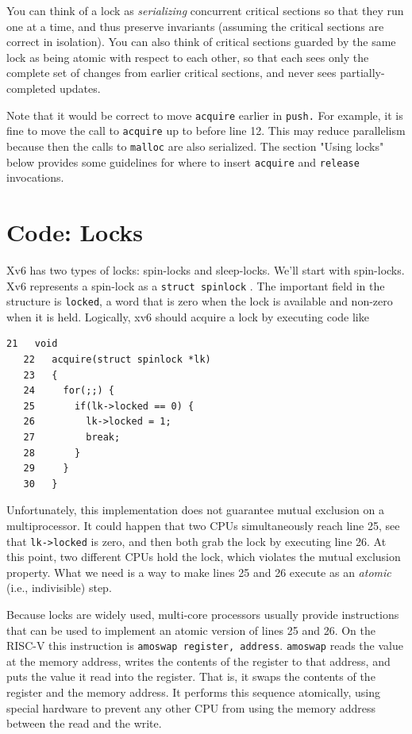 You can think of a lock as
\textit{serializing}
concurrent critical sections so that they run one at a time,
and thus preserve invariants (assuming the critical sections
are correct in isolation).
You can also think of critical sections guarded by the same lock as being
atomic with respect to each other,
so that each sees only the complete set of
changes from earlier critical sections, and never sees
partially-completed updates.

Note that it would be correct to move
\lstinline{acquire}
earlier in
\lstinline{push.}
For example, it is fine to move the call to
\lstinline{acquire}
up to before line 12.
This may reduce parallelism because then the calls
to
\lstinline{malloc}
are also serialized.
The section "Using locks" below provides some guidelines for where to insert
\lstinline{acquire}
and
\lstinline{release}
invocations.
\section{Code: Locks}
Xv6 has two types of locks: spin-locks and sleep-locks.
We'll start with spin-locks.
Xv6 represents a spin-lock as a
\lstinline{struct spinlock}
.
The important field in the structure is
\lstinline{locked},
a word that is zero when the lock is available
and non-zero when it is held.
Logically, xv6 should acquire a lock by executing code like
\begin{lstlisting}[]
   21	void
   22	acquire(struct spinlock *lk)
   23	{
   24	  for(;;) {
   25	    if(lk->locked == 0) {
   26	      lk->locked = 1;
   27	      break;
   28	    }
   29	  }
   30	}
\end{lstlisting}
Unfortunately, this implementation does not
guarantee mutual exclusion on a multiprocessor.
It could happen that two CPUs simultaneously
reach line 25, see that 
\lstinline{lk->locked}
is zero, and then both grab the lock by executing line 26.
At this point, two different CPUs hold the lock,
which violates the mutual exclusion property.
What we need is a way to
make lines 25 and 26 execute as an
\textit{atomic}
(i.e., indivisible) step.

Because locks are widely used,
multi-core processors usually provide instructions that
can be used to implement an atomic version of
lines 25 and 26.
On the RISC-V this instruction is
\lstinline{amoswap register, address}.
\lstinline{amoswap}
reads the value at the memory address,
writes the contents of the register to that address,
and puts the value it read into the register.
That is, it swaps the contents of the register and the memory address.
It performs this sequence atomically, using special
hardware to prevent any
other CPU from using the memory address between the read and the write.

